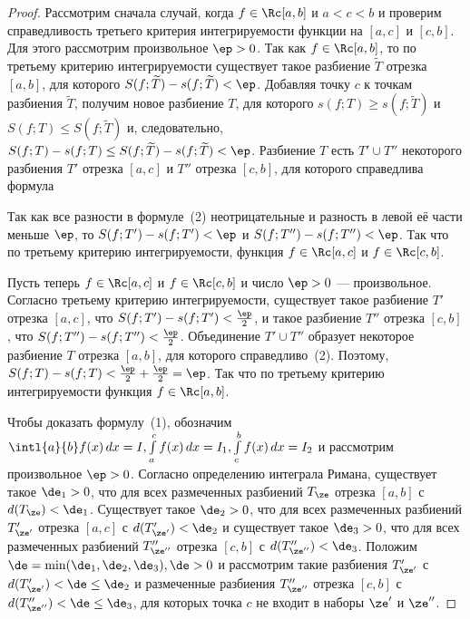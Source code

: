 \documentclass[a4paper]{article}
\begin{document}
\begin{proof}
Рассмотрим сначала случай, когда $f\in\Rc[a,b]$ и $a<c<b$ и проверим
справедливость третьего критерия интегрируемости функции на $[a,c]$
и $[c,b]$. Для этого рассмотрим произвольное $\ep>0$. Так как
$f\in\Rc[a,b]$, то по третьему критерию интегрируемости существует
такое разбиение $\widetilde T$ отрезка $[a,b]$, для которого
$S(f;\widetilde T)-s(f;\widetilde T)<\ep$. Добавляя точку $c$ к
точкам разбиения $\widetilde T$, получим новое разбиение $T$, для
которого $s(f;T)\ge s(f;\widetilde T)$ и $S(f;T)\le S(f;\widetilde
T)$ и, следовательно, $S(f;T)-s(f;T)\le S(f;\widetilde
T)-s(f;\widetilde T)<\ep$. Разбиение $T$ есть $T'\cup T''$
некоторого разбиения $T'$ отрезка $[a,c]$ и $T''$ отрезка $[c,b]$,
для которого справедлива формула

Так как все разности в формуле~(2) неотрицательные и разность в
левой её части меньше $\ep$, то $S(f;T')-s(f;T')<\ep$ и
$S(f;T'')-s(f;T'')<\ep$. Так что по третьему критерию
интегрируемости, функция $f\in\Rc[a,c]$ и $f\in\Rc[c,b]$.

Пусть теперь $f\in\Rc[a,c]$ и $f\in\Rc[c,b]$ и число $\ep>0$ ---
произвольное. Согласно третьему критерию интегрируемости, существует
такое разбиение $T'$ отрезка $[a,c]$, что
$S(f;T')-s(f;T')<\frac{\ep}2$, и такое разбиение $T''$ отрезка
$[c,b]$, что $S(f;T'')-s(f;T'')<\frac{\ep}2$. Объединение $T'\cup
T''$ образует некоторое разбиение $T$ отрезка $[a,b]$, для которого
справедливо~(2). Поэтому,
$S(f;T)-s(f;T)<\frac{\ep}2+\frac{\ep}2=\ep$. Так что по третьему
критерию интегрируемости функция $f\in\Rc[a,b]$.

Чтобы доказать формулу~(1), обозначим $\intl{a}{b} f(x)\,dx=I,
\int\limits_a^c f(x)\,dx=I_1, \int\limits_c^b f(x)\,dx=I_2$ и
рассмотрим произвольное $\ep>0$. Согласно определению интеграла
Римана, существует такое $\de_1>0$, что
 для всех размеченных
разбиений $T_{\ze}$ отрезка $[a,b]$ с $d(T_{\ze})<\de_1$. Существует
такое $\de_2>0$, что 
для всех размеченных разбиений $T'_{\ze'}$ отрезка $[a,c]$ с
$d(T'_{\ze'})<\de_2$ и существует такое $\de_3>0$, что
 для всех
размеченных разбиений $T''_{\ze''}$ отрезка $[c,b]$ с
$d(T''_{\ze''})<\de_3$. Положим $\de=\min(\de_1,\de_2,\de_3),\de>0$
и рассмотрим такие разбиения $T'_{\ze'}$ с
$d(T'_{\ze'})<\de\le\de_2$ и размеченные разбиения $T''_{\ze''}$
отрезка $[c,b]$ с $d(T''_{\ze''})<\de\le\de_3$, для которых точка
$c$ не входит в наборы $\ze'$ и $\ze''$.


\end{proof}
\end{document}
